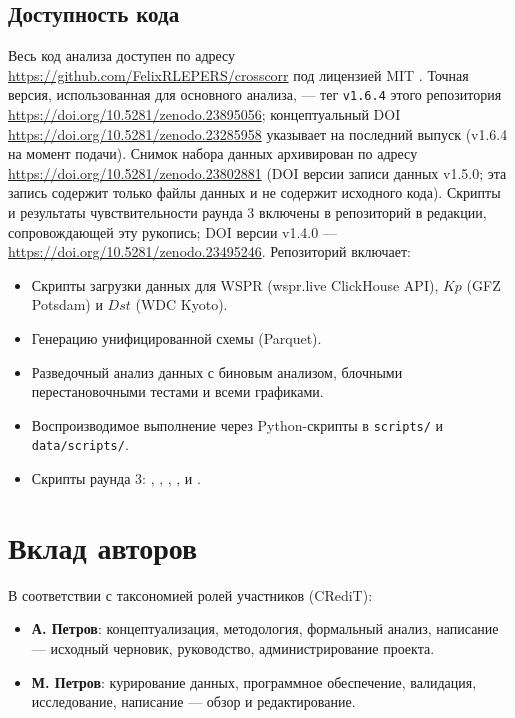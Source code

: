 \documentclass{agujournal2019}
\providecommand{\DIFaddtex}[1]{{\protect\color{blue}\uwave{#1}}} %
\providecommand{\DIFaddbegin}{} %
\providecommand{\DIFaddend}{} %
\providecommand{\DIFadd}[1]{\texorpdfstring{\DIFaddtex{#1}}{#1}} %
\providecommand{\DIFaddincludegraphics}[2][]{{\color{blue}\fbox{\DIFOincludegraphics[#1]{#2}}}} %
\DeclareRobustCommand{\DIFaddbegin}{\DIFOaddbegin \let\includegraphics\DIFaddincludegraphics} %
\DeclareRobustCommand{\DIFaddend}{\DIFOaddend \let\includegraphics\DIFOincludegraphics} %
\begin{document}
\subsection*{Доступность кода}

Весь код анализа доступен по адресу
\url{https://github.com/FelixRLEPERS/crosscorr}
под лицензией MIT \DIFaddbegin \DIFadd{\mbox{%
\citep{crosscorr_code}}\hskip0pt%
}\DIFaddend . Точная версия, использованная для
основного анализа, — тег \texttt{v1.6.4} этого репозитория \DIFaddbegin \DIFadd{(DOI версии
}\url{https://doi.org/10.5281/zenodo.23895056}\DIFadd{)}\DIFaddend ; концептуальный DOI
\url{https://doi.org/10.5281/zenodo.23285958} указывает на последний
выпуск (v1.6.4 на момент подачи). Снимок набора данных
архивирован по адресу
\url{https://doi.org/10.5281/zenodo.23802881} (DOI версии записи
данных v1.5.0; эта запись содержит только файлы данных и не содержит
исходного кода). Скрипты и результаты чувствительности раунда 3 включены в
репозиторий в редакции, сопровождающей эту рукопись; DOI версии
v1.4.0 — \url{https://doi.org/10.5281/zenodo.23495246}.
Репозиторий включает:

{\sloppy
\begin{itemize}
	\item Скрипты загрузки данных для WSPR (wspr.live ClickHouse API),
	      $Kp$ (GFZ Potsdam) и $Dst$ (WDC Kyoto).
	\item Генерацию унифицированной схемы (Parquet).
	\item Разведочный анализ данных с биновым анализом, блочными
	      перестановочными тестами и всеми графиками.
	\item Воспроизводимое выполнение через Python-скрипты в
	      \texttt{scripts/} и \texttt{data/scripts/}.
	\item Скрипты раунда 3: ,
	      ,
	      ,
	      ,
	       и
	      .
\end{itemize}
\par}


\section*{Вклад авторов}

В соответствии с таксономией ролей участников (CRediT):
\begin{itemize}
	\item \textbf{А. Петров}: концептуализация, методология, формальный
	      анализ, написание — исходный черновик, руководство,
	      администрирование проекта.
	\item \textbf{М. Петров}: курирование данных, программное обеспечение,
	      валидация, исследование, написание — обзор и редактирование.
\end{itemize}
\end{document}
